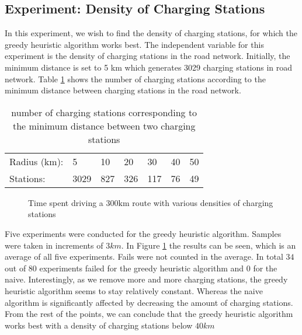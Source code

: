 \subsection{Experiment: Density of Charging Stations}
In this experiment, we wish to find the density of charging stations, for which the greedy heuristic algorithm works best. The independent variable for this experiment is the density of charging stations in the road network. Initially, the minimum distance is set to 5 km which generates 3029 charging stations in road network. Table \ref{table:chargedensity} shows the number of charging stations according to the minimum distance between charging stations in the road network.

\begin{table}[!htb]
\centering
		\begin{tabular}{ p{1.85cm} p{0.67cm} p{0.63cm} p{0.63cm} p{0.63cm} p{0.63cm} p{0.63cm} }
        \hline 
		Radius (km): & 5 & 10 & 20 & 30 & 40 & 50 \\ 
		Stations: & 3029 & 827 & 326 & 117 & 76 & 49 \\
        \hline
		\end{tabular}
		\caption{number of charging stations corresponding to the minimum distance between two charging stations}
	\label{table:chargedensity}
	\end{table}

\begin{figure}[!htb]
\centering
{}
\caption{Time spent driving a $300 \si{\km}$ route with various densities of charging stations} 
\label{fig:cs_density}
\end{figure}

Five experiments were conducted for the greedy heuristic algorithm. Samples were taken in increments of $3\si{km}$. In Figure \ref{fig:cs_density} the results can be seen, which is an average of all five experiments. Fails were not counted in the average. In total $34$ out of $80$ experiments failed for the greedy heuristic algorithm and $0$ for the naive. Interestingly, as we remove more and more charging stations, the greedy heuristic algorithm seems to stay relatively constant. Whereas the naive algorithm is significantly affected by decreasing the amount of charging stations. From the rest of the points, we can conclude that the greedy heuristic algorithm works best with a density of charging stations below $40\si{km}$


